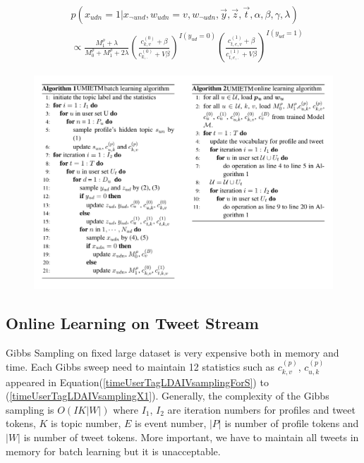 \documentclass[runningheads,a4paper]{llncs}
\begin{document}
\begin{scriptsize}
\begin{equation}
\label{timeUserTagLDAIVsamplingX1}
\begin{aligned}
&p(x_{udn}=1|x_{\neg{und}},w_{udn}=v,w_{\neg{udn}},\vec{y},\vec{z},\vec{t},\alpha,\beta,\gamma,\lambda)\\
&\propto \frac{M^{\rho}_1+\lambda}{M^{\rho}_0+M^{\rho}_1+2\lambda} (\frac{c_{k,v}^{(0)}+\beta}{c_{k,.}^{(0)}+V\beta})^{I(y_{ud}=0)}(\frac{c_{t,e,v}^{(1)}+\beta}{c_{t,e,.}^{(1)}+V\beta})^{I(y_{ud}=1)}
\end{aligned}
\end{equation}
\end{scriptsize}

\begin{figure}
    \label{fig:algorithm}
    \includegraphics[width=1.0\textwidth]{img/algorithm.pdf}
\end{figure}


\subsection{Online Learning on Tweet Stream}\label{subsec:online}
Gibbs Sampling on fixed large dataset is very expensive both in memory and time.
Each Gibbs sweep need to maintain 12 statistics such as \(c^{(p)}_{k,v}\), \(c^{(p)}_{u,k}\) appeared in Equation(\ref{timeUserTagLDAIVsamplingForS}) to (\ref{timeUserTagLDAIVsamplingX1}).
Generally, the complexity of the Gibbs sampling is \(O(IK|W|)\) where \(I_1\), \(I_2\) are iteration numbers for profiles and tweet tokens, \(K\) is topic number, \(E\) is event number, \(|P|\) is number of profile tokens and \(|W|\) is number of tweet tokens.
More important, we have to maintain all tweets in memory for batch learning but it is unacceptable.
\end{document}
